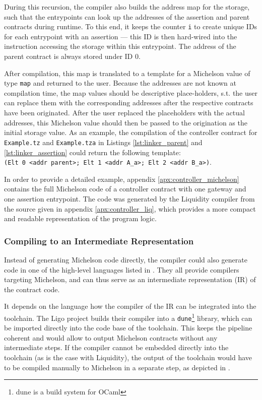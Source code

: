 During this recursion, the compiler also builds the address map for the storage, such that the entrypoints can look up the addresses of the assertion and parent contracts during runtime. To this end, it keeps the counter \texttt{i} to create unique IDs for each entrypoint with an assertion --- this ID is then hard-wired into the instruction accessing the storage within this entrypoint. The address of the parent contract is always stored under ID 0. 

After compilation, this map is translated to a template for a Michelson value of type \texttt{map} and returned to the user. Because the addresses are not known at compilation time, the map values should be descriptive place-holders, s.t. the user can replace them with the corresponding addresses after the respective contracts have been originated. After the user replaced the placeholders with the actual addresses, this Michelson value should then be passed to the origination as the initial storage value. As an example, the compilation of the controller contract for \texttt{Example.tz} and \texttt{Example.tza} in Listings \ref{lst:linker_parent} and \ref{lst:linker_assertion} could return the following template:\\ \texttt{(Elt 0 <addr parent>; Elt 1 <addr A\_a>; Elt 2 <addr B\_a>)}.

In order to provide a detailed example, appendix \ref{apx:controller_michelson} contains the full Michelson code of a controller contract with one gateway and one assertion entrypoint. The code was generated by the Liquidity compiler from the source given in appendix \ref{apx:controller_liq}, which provides a more compact and readable representation of the program logic.

\subsubsection{Compiling to an Intermediate Representation}\label{sec:IR}
Instead of generating Michelson code directly, the compiler could also generate code in one of the high-level languages listed in . They all provide compilers targeting Michelson, and can thus serve as an intermediate representation (IR) of the contract code.

It depends on the language how the compiler of the IR can be integrated into the toolchain. The Ligo project builds their compiler into a \texttt{dune}\footnote{dune \cite{dune} is a build system for OCaml} library, which can be imported directly into the code base of the toolchain. This keeps the pipeline coherent and would allow to output Michelson contracts without any intermediate steps. If the compiler cannot be embedded directly into the toolchain (as is the case with Liquidity), the output of the toolchain would have to be compiled manually to Michelson in a separate step, as depicted in .

